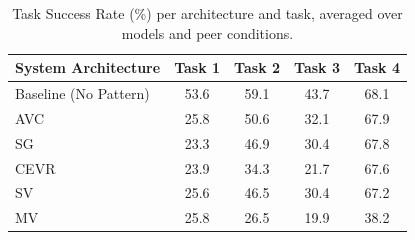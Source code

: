 \begin{table}[!tp]
\centering
\caption{Task Success Rate (\%) per architecture and task, averaged over models and peer conditions.}
\label{tab:tsr}
\begin{tabular}{lcccc}
\toprule
\textbf{System Architecture} & \textbf{Task 1} & \textbf{Task 2} & \textbf{Task 3} & \textbf{Task 4} \\
\midrule
Baseline (No Pattern) & 53.6 & 59.1 & 43.7 & 68.1 \\
AVC & 25.8 & 50.6 & 32.1 & 67.9 \\
SG & 23.3 & 46.9 & 30.4 & 67.8 \\
CEVR & 23.9 & 34.3 & 21.7 & 67.6 \\
SV & 25.6 & 46.5 & 30.4 & 67.2 \\
MV & 25.8 & 26.5 & 19.9 & 38.2 \\
\bottomrule
\end{tabular}
\end{table}
